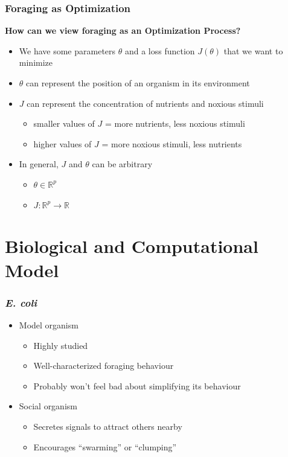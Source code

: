 \documentclass{beamer}
\begin{document}
\begin{frame}
\frametitle{Foraging as Optimization}
\textbf{How can we view foraging as an Optimization Process?}
\begin{itemize}
  \item<1-> We have some parameters $\theta$ and a loss function $J(\theta)$ that we want to minimize
  \item<2-> $\theta$ can represent the position of an organism in its environment
  \item<3-> $J$ can represent the concentration of nutrients and noxious stimuli
  \begin{itemize}
    \item smaller values of $J$ = more nutrients, less noxious stimuli
    \item higher values of $J$ = more noxious stimuli, less nutrients
  \end{itemize}
  \item<4-> In general, $J$ and $\theta$ can be arbitrary
  \begin{itemize}
    \item $\theta \in \mathbb{R}^p$
    \item $J: \mathbb{R}^p \to \mathbb{R}$
  \end{itemize}
\end{itemize}
\end{frame}

\section{Biological and Computational Model}
\begin{frame}
\frametitle{\textit{E. coli}}
\begin{itemize}
  \item<1-> Model organism
  \begin{itemize}
    \item<1-> Highly studied
    \item<1-> Well-characterized foraging behaviour
    \item<1-> Probably won't feel bad about simplifying its behaviour
  \end{itemize}
  \item<2-> Social organism
  \begin{itemize}
    \item<2-> Secretes signals to attract others nearby
    \item<2-> Encourages ``swarming'' or ``clumping''
  \end{itemize}
\end{itemize}
\end{frame}
\end{document}
